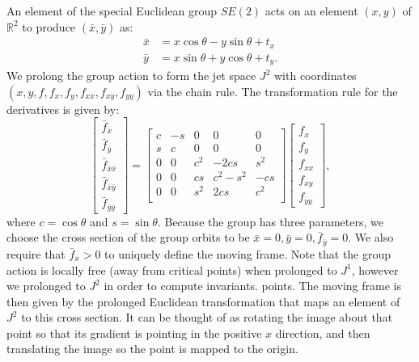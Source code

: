 \documentclass[review,onefignum,onetabnum]{siamonline190516}
\begin{document}
{An element of the special Euclidean group $SE(2)$ acts on an element $(x, y)$ of $\mathbb{R}^2$ to produce $(\bar{x}, \bar{y})$ as:
\begin{equation*}
  \begin{aligned}
    \bar{x} &= x\cos\theta  - y\sin\theta + t_x \\
    \bar{y} &= x\sin\theta  + y\cos\theta + t_y.
  \end{aligned}
\end{equation*}
We prolong the group action to form the jet space $J^2$ with coordinates $(x,
y, f, f_x, f_y, f_{xx}, f_{xy}, f_{yy})$ via the chain rule. The
transformation rule for the derivatives is given by:
\begin{equation}
  \begin{bmatrix}
  \bar f_{\bar x} \\ \bar f_{\bar y} \\ \bar f_{\bar{x}\bar{x}} \\ \bar f_{\bar{x}\bar{y}} \\ \bar f_{\bar{y}\bar{y}}
  \end{bmatrix} = 
  \begin{bmatrix}
 c & -s & 0 & 0 & 0 \\
 s & c & 0 & 0 & 0 \\
0 & 0 & c^2 & -2cs & s^2 \\
0 & 0 & cs & c^2 - s^2 & -cs \\
0 & 0 & s^2 & 2cs & c^2 \\
  \end{bmatrix}
  \begin{bmatrix}
f_x \\ f_y \\ f_{xx} \\ f_{xy} \\ f_{yy} 
  \end{bmatrix},
\label{eqn:SE2}
 \end{equation}
where $c = \cos \theta$ and $s = \sin \theta$. Because the group has three
parameters, we choose the cross section of the group orbits to be $\bar{x}
= 0, \bar{y} = 0, \bar{f}_{\bar{y}} = 0$. We also require that $\bar{f}_{x}
> 0$ to uniquely define the moving frame. Note that the group action is
locally free (away from critical points) when prolonged to $J^1$, however
we prolonged to $J^2$ in order to compute invariants. points. The moving
frame is then given by the prolonged Euclidean transformation that maps an
element of  $J^2$ to this cross section. It can be thought of as rotating
the image about that point so that its gradient is pointing in the positive
$x$ direction, and then translating the image so the point is mapped to the
origin. 

}
\end{document}
